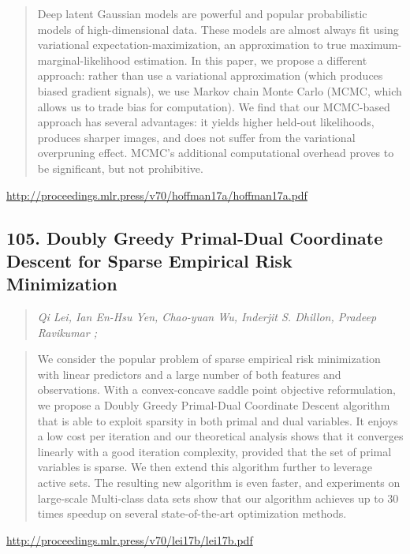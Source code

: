 \documentclass{article}
\begin{document}
\begin{quote}
    Deep latent Gaussian models are powerful and popular probabilistic models of high-dimensional data. These models are almost always fit using variational expectation-maximization, an approximation to true maximum-marginal-likelihood estimation. In this paper, we propose a different approach: rather than use a variational approximation (which produces biased gradient signals), we use Markov chain Monte Carlo (MCMC, which allows us to trade bias for computation). We find that our MCMC-based approach has several advantages: it yields higher held-out likelihoods, produces sharper images, and does not suffer from the variational overpruning effect. MCMC’s additional computational overhead proves to be significant, but not prohibitive.  \end{quote}

\href{http://proceedings.mlr.press/v70/hoffman17a/hoffman17a.pdf}{http://proceedings.mlr.press/v70/hoffman17a/hoffman17a.pdf}

\subsection{105. Doubly Greedy Primal-Dual Coordinate Descent for Sparse Empirical Risk Minimization}

\begin{quote}
\footnotesize{\textit{Qi Lei, Ian En-Hsu Yen, Chao-yuan Wu, Inderjit S. Dhillon, Pradeep Ravikumar ;}}
\end{quote}

\begin{quote}
    We consider the popular problem of sparse empirical risk minimization with linear predictors and a large number of both features and observations. With a convex-concave saddle point objective reformulation, we propose a Doubly Greedy Primal-Dual Coordinate Descent algorithm that is able to exploit sparsity in both primal and dual variables. It enjoys a low cost per iteration and our theoretical analysis shows that it converges linearly with a good iteration complexity, provided that the set of primal variables is sparse. We then extend this algorithm further to leverage active sets. The resulting new algorithm is even faster, and experiments on large-scale Multi-class data sets show that our algorithm achieves up to 30 times speedup on several state-of-the-art optimization methods.  \end{quote}

\href{http://proceedings.mlr.press/v70/lei17b/lei17b.pdf}{http://proceedings.mlr.press/v70/lei17b/lei17b.pdf}
\end{document}
